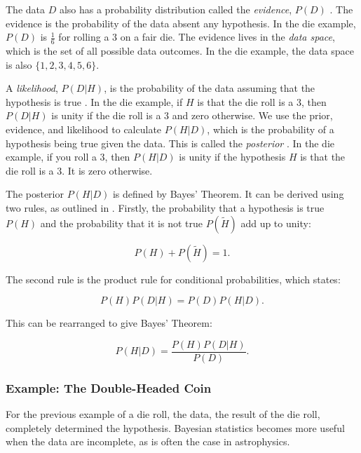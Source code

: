 \documentclass[preprint,longauthor]{aastex631}
\numberwithin{equation}{section}
\begin{document}
The data $D$ also has a probability distribution called the \textit{evidence}, $P(D)$ \citep{brewer1BayesianInference2018}. The evidence is the probability of the data absent any hypothesis. In the die example, $P(D)$ is $\frac{1}{6}$ for rolling a $3$ on a fair die. The evidence lives in the \textit{data space}, which is the set of all possible data outcomes. In the die example, the data space is also $\{1,2,3,4,5,6\}$.

A \textit{likelihood}, $P(D|H)$, is the probability of the data assuming that the hypothesis is true \citep{brewer1BayesianInference2018}. In the die example, if $H$ is that the die roll is a $3$, then $P(D|H)$ is unity if the die roll is a $3$ and zero otherwise. We use the prior, evidence, and likelihood to calculate $P(H|D)$, which is the probability of a hypothesis being true given the data. This is called the \textit{posterior} \citep{brewer1BayesianInference2018}. In the die example, if you roll a $3$, then $P(H|D)$ is unity if the hypothesis $H$ is that the die roll is a $3$. It is zero otherwise.

The posterior $P(H|D)$ is defined by Bayes' Theorem. It can be derived using two rules, as outlined in \citet{coxProbabilityFrequencyReasonable1946}. Firstly, the probability that a hypothesis is true $P(H)$ and the probability that it is not true $P(\tilde{H})$ add up to unity:

\begin{equation}
  P(H) + P(\tilde{H}) = 1.
\end{equation}

The second rule is the product rule for conditional probabilities, which states:

\begin{equation}
  P(H)P(D|H) = P(D)P(H|D).
\end{equation}

This can be rearranged to give Bayes' Theorem:

\begin{equation}
  P(H|D) = \frac{P(H)P(D|H)}{P(D)}.
  \label{eq:bayes_theorem}
\end{equation}

\subsubsection{Example: The Double-Headed Coin}
For the previous example of a die roll, the data, the result of the die roll, completely determined the hypothesis. Bayesian statistics becomes more useful when the data are incomplete, as is often the case in astrophysics.
\end{document}
